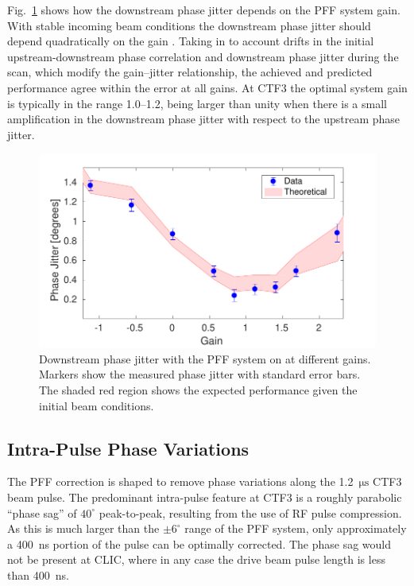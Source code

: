 \documentclass[%
 reprint,
superscriptaddress,
 amsmath,amssymb,
 prl,
]{revtex4-1}
\begin{document}
Fig.~\ref{fig:gScan} shows how the downstream phase jitter depends on the PFF 
system gain. With stable incoming beam conditions the downstream phase jitter 
should depend quadratically on the gain \cite{RobertsThesis}. Taking in to 
account drifts in the initial upstream-downstream phase correlation and 
downstream phase jitter during the scan, which modify the gain--jitter 
relationship, the achieved and predicted performance agree within the error at 
all gains. At CTF3 the optimal system gain is typically in the range 1.0--1.2, 
being larger than unity when there is a small amplification in the downstream 
phase jitter with respect to the upstream phase jitter.

\begin{figure}
\includegraphics[width=\columnwidth]{figs/gScan}%
\caption{\label{fig:gScan}Downstream phase jitter with the PFF system on at 
different gains. Markers show the measured phase jitter with standard error 
bars. The shaded red region shows the expected performance given the initial 
beam conditions.}
\end{figure}

\subsection{\label{ss:shape}Intra-Pulse Phase Variations}

The PFF correction is shaped to remove phase variations along the 
1.2~\(\mathrm{\mu s}\) CTF3 beam pulse. The predominant intra-pulse feature at 
CTF3
is a roughly parabolic ``phase sag'' of \(40^\circ\) peak-to-peak, resulting 
from the use of RF pulse compression. As this is much larger than the 
\(\pm 6^\circ\) range of the PFF system, only approximately a 400~ns portion of 
the pulse can be optimally corrected. The phase sag would not be present at 
CLIC, where in any case the drive beam pulse length is less than 400~ns.
\end{document}
